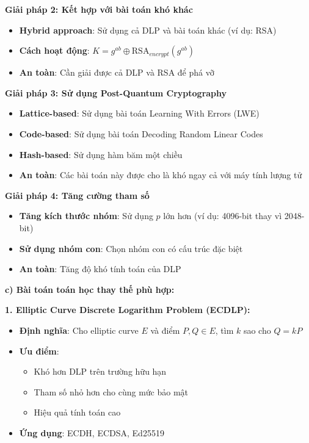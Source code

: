 \textbf{Giải pháp 2: Kết hợp với bài toán khó khác}
\begin{itemize}
    \item \textbf{Hybrid approach}: Sử dụng cả DLP và bài toán khác (ví dụ: RSA)
    \item \textbf{Cách hoạt động}: $K = g^{ab} \oplus \text{RSA}_{encrypt}(g^{ab})$
    \item \textbf{An toàn}: Cần giải được cả DLP và RSA để phá vỡ
\end{itemize}

\textbf{Giải pháp 3: Sử dụng Post-Quantum Cryptography}
\begin{itemize}
    \item \textbf{Lattice-based}: Sử dụng bài toán Learning With Errors (LWE)
    \item \textbf{Code-based}: Sử dụng bài toán Decoding Random Linear Codes
    \item \textbf{Hash-based}: Sử dụng hàm băm một chiều
    \item \textbf{An toàn}: Các bài toán này được cho là khó ngay cả với máy tính lượng tử
\end{itemize}

\textbf{Giải pháp 4: Tăng cường tham số}
\begin{itemize}
    \item \textbf{Tăng kích thước nhóm}: Sử dụng $p$ lớn hơn (ví dụ: 4096-bit thay vì 2048-bit)
    \item \textbf{Sử dụng nhóm con}: Chọn nhóm con có cấu trúc đặc biệt
    \item \textbf{An toàn}: Tăng độ khó tính toán của DLP
\end{itemize}

\textbf{c) Bài toán toán học thay thế phù hợp:}

\textbf{1. Elliptic Curve Discrete Logarithm Problem (ECDLP):}
\begin{itemize}
    \item \textbf{Định nghĩa}: Cho elliptic curve $E$ và điểm $P, Q \in E$, tìm $k$ sao cho $Q = kP$
    \item \textbf{Ưu điểm}: 
    \begin{itemize}
        \item Khó hơn DLP trên trường hữu hạn
        \item Tham số nhỏ hơn cho cùng mức bảo mật
        \item Hiệu quả tính toán cao
    \end{itemize}
    \item \textbf{Ứng dụng}: ECDH, ECDSA, Ed25519
\end{itemize}

